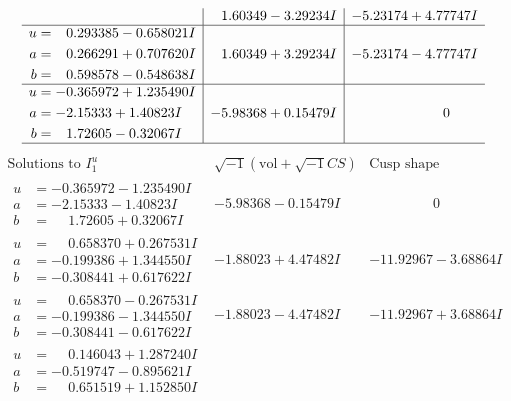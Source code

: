 \documentclass[1p]{elsarticle_modified}
\theoremstyle{definition}
\newcommand{\I}{\sqrt{-1}}
\begin{document}
$$\begin{array}{c|c|c}
 & \phantom{-}1.60349 - 3.29234 I & -5.23174 + 4.77747 I \\ \hline\begin{aligned}
u &= \phantom{-}0.293385 - 0.658021 I \\
a &= \phantom{-}0.266291 + 0.707620 I \\
b &= \phantom{-}0.598578 - 0.548638 I\end{aligned}
 & \phantom{-}1.60349 + 3.29234 I & -5.23174 - 4.77747 I \\ \hline\begin{aligned}
u &= -0.365972 + 1.235490 I \\
a &= -2.15333 + 1.40823 I \\
b &= \phantom{-}1.72605 - 0.32067 I\end{aligned}
 & -5.98368 + 0.15479 I & \phantom{-0.000000 } 0\\
 \hline 
 \end{array}$$\newpage$$\begin{array}{c|c|c}  
\text{Solutions to }I^u_{1}& \I (\text{vol} + \sqrt{-1}CS) & \text{Cusp shape}\\
 \hline 
\begin{aligned}
u &= -0.365972 - 1.235490 I \\
a &= -2.15333 - 1.40823 I \\
b &= \phantom{-}1.72605 + 0.32067 I\end{aligned}
 & -5.98368 - 0.15479 I & \phantom{-0.000000 } 0 \\ \hline\begin{aligned}
u &= \phantom{-}0.658370 + 0.267531 I \\
a &= -0.199386 + 1.344550 I \\
b &= -0.308441 + 0.617622 I\end{aligned}
 & -1.88023 + 4.47482 I & -11.92967 - 3.68864 I \\ \hline\begin{aligned}
u &= \phantom{-}0.658370 - 0.267531 I \\
a &= -0.199386 - 1.344550 I \\
b &= -0.308441 - 0.617622 I\end{aligned}
 & -1.88023 - 4.47482 I & -11.92967 + 3.68864 I \\ \hline\begin{aligned}
u &= \phantom{-}0.146043 + 1.287240 I \\
a &= -0.519747 - 0.895621 I \\
b &= \phantom{-}0.651519 + 1.152850 I\end{aligned}

\end{array}$$
\end{document}
